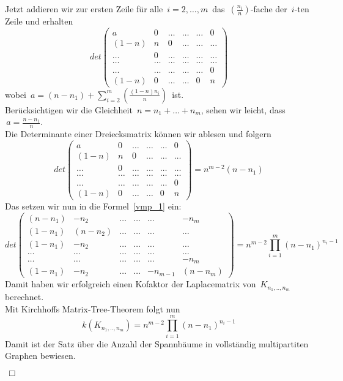 Jetzt addieren wir zur ersten Zeile für alle $\,i=2,\ldots,m\,$ das $\,\left(\frac{n_i}{n}\right)$-fache der $\,i$-ten Zeile und erhalten
\begin{equation*}
det
\begin{pmatrix}
 a&0&\ldots&\ldots&\ldots&0\\
 (1-n)&n&0&\ldots&\ldots&\ldots\\
 \ldots&0&\ldots&\ldots&\ldots&\ldots\\
 \ldots&\ldots&\ldots&\ldots&\ldots&\ldots\\
 \ldots&\ldots&\ldots&\ldots&\ldots&0\\
 (1-n)&0&\ldots&\ldots&0&n
\end{pmatrix}
\end{equation*}
wobei $\,a = (n-n_1)+\sum_{i=2}^m\left(\frac{(1-n)n_i}{n}\right)\,$ ist.\\
Berücksichtigen wir die Gleichheit $\,n=n_1+\ldots+n_m$,\; sehen wir leicht, dass $\,a=\frac{n-n_1}{n}$.\; \\
Die Determinante einer Dreiecksmatrix können wir ablesen und folgern
\begin{equation*}
det
\begin{pmatrix}
 a&0&\ldots&\ldots&\ldots&0\\
 (1-n)&n&0&\ldots&\ldots&\ldots\\
 \ldots&0&\ldots&\ldots&\ldots&\ldots\\
 \ldots&\ldots&\ldots&\ldots&\ldots&\ldots\\
 \ldots&\ldots&\ldots&\ldots&\ldots&0\\
 (1-n)&0&\ldots&\ldots&0&n
\end{pmatrix}
= n^{m-2}(n-n_1)
\end{equation*}
Das setzen wir nun in die Formel~\ref{vmp_1} ein:
\begin{equation*}
 det
\begin{pmatrix}
 (n-n_1)&-n_2&\ldots&\ldots&\ldots&-n_m\\
 (1-n_1)&(n-n_2)&\ldots&\ldots&\ldots&\ldots\\
 (1-n_1)&-n_2&\ldots&\ldots&\ldots&\ldots\\
 \ldots&\ldots&\ldots&\ldots&\ldots&\ldots\\
 \ldots&\ldots&\ldots&\ldots&\ldots&-n_m\\
 (1-n_1)&-n_2&\ldots&\ldots&-n_{m-1}&(n-n_m)
\end{pmatrix}
= n^{m-2}\prod_{i=1}^{m}(n-n_1)^{n_i-1}
\end{equation*}
Damit haben wir erfolgreich einen Kofaktor der Laplacematrix von $\,K_{n_1,..,n_m}\,$ berechnet.\\
Mit Kirchhoffs Matrix-Tree-Theorem folgt nun
\begin{equation*}
 \mathit{k}(K_{n_1,..,n_m})=n^{m-2}\prod_{i=1}^{m}(n-n_1)^{n_i-1}
\end{equation*}
Damit ist der Satz über die Anzahl der Spannbäume in vollständig multipartiten Graphen bewiesen.
\begin{flushright} $\,\Box\,$ \end{flushright}
